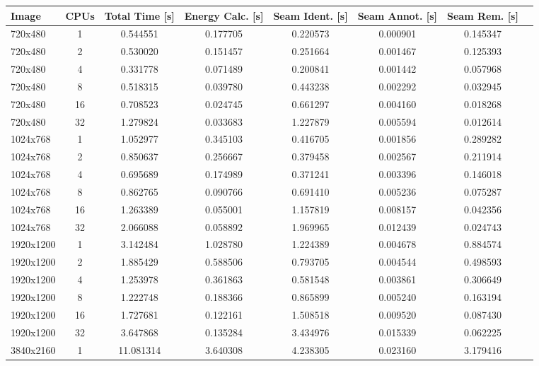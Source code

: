 \documentclass{article}
\begin{document}
\begin{table}[H]
    \centering
    \scriptsize
    \begin{tabular}{lccccccc}
        \toprule
        Image & CPUs & Total Time [s] & Energy Calc. [s] & Seam Ident. [s] & Seam Annot. [s] & Seam Rem. [s] \\
        \midrule
        720x480   & 1  & 0.544551  & 0.177705 & 0.220573 & 0.000901 & 0.145347 \\
        720x480   & 2  & 0.530020  & 0.151457 & 0.251664 & 0.001467 & 0.125393 \\
        720x480   & 4  & 0.331778  & 0.071489 & 0.200841 & 0.001442 & 0.057968 \\
        720x480   & 8  & 0.518315  & 0.039780 & 0.443238 & 0.002292 & 0.032945 \\
        720x480   & 16 & 0.708523  & 0.024745 & 0.661297 & 0.004160 & 0.018268 \\
        720x480   & 32 & 1.279824  & 0.033683 & 1.227879 & 0.005594 & 0.012614 \\
        \midrule
        1024x768 & 1  & 1.052977 & 0.345103 & 0.416705 & 0.001856 & 0.289282 \\
        1024x768 & 2  & 0.850637 & 0.256667 & 0.379458 & 0.002567 & 0.211914 \\
        1024x768 & 4  & 0.695689 & 0.174989 & 0.371241 & 0.003396 & 0.146018 \\
        1024x768 & 8  & 0.862765 & 0.090766 & 0.691410 & 0.005236 & 0.075287 \\
        1024x768 & 16 & 1.263389 & 0.055001 & 1.157819 & 0.008157 & 0.042356 \\
        1024x768 & 32 & 2.066088 & 0.058892 & 1.969965 & 0.012439 & 0.024743 \\
        \midrule
        1920x1200 & 1  & 3.142484 & 1.028780 & 1.224389 & 0.004678 & 0.884574 \\
        1920x1200 & 2  & 1.885429 & 0.588506 & 0.793705 & 0.004544 & 0.498593 \\
        1920x1200 & 4  & 1.253978 & 0.361863 & 0.581548 & 0.003861 & 0.306649 \\
        1920x1200 & 8  & 1.222748 & 0.188366 & 0.865899 & 0.005240 & 0.163194 \\
        1920x1200 & 16 & 1.727681 & 0.122161 & 1.508518 & 0.009520 & 0.087430 \\
        1920x1200 & 32 & 3.647868 & 0.135284 & 3.434976 & 0.015339 & 0.062225 \\
        \midrule
        3840x2160 & 1  & 11.081314 & 3.640308 & 4.238305 & 0.023160 & 3.179416 \\

\end{tabular}
\end{table}
\end{document}
